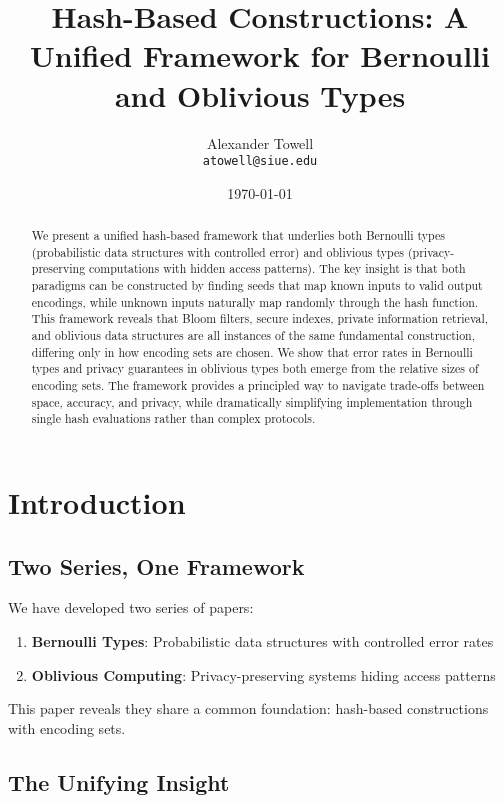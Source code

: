 \documentclass[11pt,final,hidelinks]{article}
\title{Hash-Based Constructions: A Unified Framework for Bernoulli and Oblivious Types}
\author{
    Alexander Towell\\
    \texttt{atowell@siue.edu}
}
\date{\today}
\begin{document}
\maketitle

\begin{abstract}
We present a unified hash-based framework that underlies both Bernoulli types (probabilistic data structures with controlled error) and oblivious types (privacy-preserving computations with hidden access patterns). The key insight is that both paradigms can be constructed by finding seeds that map known inputs to valid output encodings, while unknown inputs naturally map randomly through the hash function. This framework reveals that Bloom filters, secure indexes, private information retrieval, and oblivious data structures are all instances of the same fundamental construction, differing only in how encoding sets are chosen. We show that error rates in Bernoulli types and privacy guarantees in oblivious types both emerge from the relative sizes of encoding sets. The framework provides a principled way to navigate trade-offs between space, accuracy, and privacy, while dramatically simplifying implementation through single hash evaluations rather than complex protocols.
\end{abstract}

\section{Introduction}

\subsection{Two Series, One Framework}

We have developed two series of papers:
\begin{enumerate}
    \item \textbf{Bernoulli Types}: Probabilistic data structures with controlled error rates
    \item \textbf{Oblivious Computing}: Privacy-preserving systems hiding access patterns
\end{enumerate}

This paper reveals they share a common foundation: hash-based constructions with encoding sets.

\subsection{The Unifying Insight}
\end{document}
